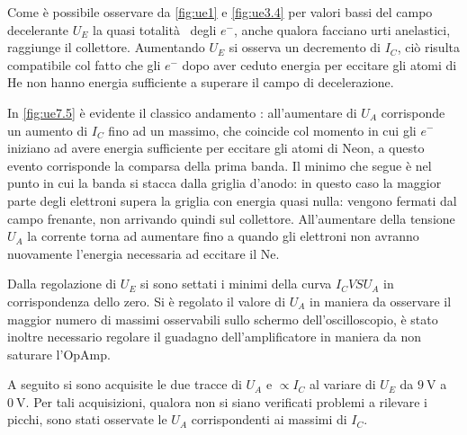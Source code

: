 	Come è possibile osservare da \figurename{ \ref{fig:ue1}} e \figurename{ \ref{fig:ue3.4}}
	per valori bassi del campo decelerante $U_E$ la quasi totalità  degli $e^{-}$, anche qualora facciano
	urti anelastici, raggiunge il collettore.
	Aumentando $U_E$ si osserva un decremento
	di $I_C$, ciò risulta compatibile col fatto che gli $e^{-}$
	dopo aver ceduto energia per eccitare gli atomi di He
	non hanno energia sufficiente a superare il campo di decelerazione.

In \figurename{ \ref{fig:ue7.5}} è evidente il classico andamento  : all'aumentare di $U_A$ corrisponde un aumento di $I_C$ fino ad un massimo, che coincide col momento in cui gli $e^-$ iniziano ad avere energia sufficiente per eccitare gli atomi di Neon, a questo evento corrisponde la comparsa della prima banda.
	Il minimo che segue è nel punto in cui la banda si stacca dalla griglia d'anodo: in questo caso la maggior parte degli elettroni supera la griglia con energia quasi nulla: vengono fermati dal campo frenante, non arrivando quindi sul collettore.
	All'aumentare della tensione $U_A$ la corrente torna ad aumentare fino a quando gli elettroni non avranno nuovamente l'energia necessaria ad eccitare il Ne.

	Dalla regolazione di $U_E$ si sono settati i minimi della curva
	$I_C VS U_A$ in corrispondenza dello zero.
	Si è regolato il valore di $U_A$ in maniera da osservare il maggior
	numero di massimi osservabili sullo schermo dell'oscilloscopio,
	è stato inoltre necessario regolare il guadagno dell'amplificatore
	in maniera da non saturare l'OpAmp.

	A seguito si sono acquisite le due tracce di $U_A$ e $\propto I_C$ al variare di
	$U_E$ da $\SI{9}{\volt}$ a $\SI{0}{\volt}$. Per  tali acquisizioni, qualora non si siano
	verificati problemi a rilevare i picchi, sono stati
	osservate le $U_A$ corrispondenti ai massimi di $I_C$.


